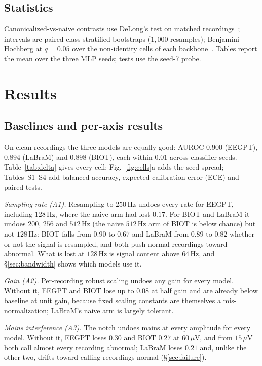 \documentclass[conference]{IEEEtran}
\begin{document}
\subsection{Statistics}
\label{sec:stats}
Canonicalized-vs-naive contrasts use DeLong's test on matched
recordings~\cite{delong1988comparing}; intervals are paired
class-stratified bootstraps ($1{,}000$ resamples); Benjamini--Hochberg
at $q{=}0.05$ over the non-identity cells of each
backbone~\cite{benjamini1995controlling}. Tables report the mean over
the three MLP seeds; tests use the seed-7 probe.

\section{Results}
\label{sec:results}

\subsection{Baselines and per-axis results}
\label{sec:axes}
On clean recordings the three models are equally good: AUROC $0.900$
(EEGPT), $0.894$ (LaBraM) and $0.898$ (BIOT), each within $0.01$ across
classifier seeds. Table~\ref{tab:delta} gives every cell;
Fig.~\ref{fig:cells}a adds the seed spread; Tables~S1--S4 add balanced
accuracy, expected calibration error (ECE) and paired tests.

\textit{Sampling rate (A1).} Resampling to $250$\,Hz undoes every rate
for EEGPT, including $128$\,Hz, where the naive arm had lost $0.17$.
For BIOT and LaBraM it undoes $200$, $256$ and $512$\,Hz (the naive
$512$\,Hz arm of BIOT is below chance) but not $128$\,Hz: BIOT falls
from $0.90$ to $0.67$ and LaBraM from $0.89$ to $0.82$ whether or not
the signal is resampled, and both push normal recordings toward
abnormal. What is lost at $128$\,Hz is signal content above $64$\,Hz,
and \S\ref{sec:bandwidth} shows which models use it.

\textit{Gain (A2).} Per-recording robust scaling undoes any gain for
every model. Without it, EEGPT and BIOT lose up to $0.08$ at half
gain and are already below baseline at unit gain, because fixed
scaling constants are themselves a mis-normalization; LaBraM's naive
arm is largely tolerant.

\textit{Mains interference (A3).} The notch undoes mains at every
amplitude for every model. Without it, EEGPT loses $0.30$ and BIOT
$0.27$ at $60\,\mu$V, and from $15\,\mu$V both call almost every
recording abnormal; LaBraM loses $0.21$ and, unlike the other two,
drifts toward calling recordings normal (\S\ref{sec:failure}).
\end{document}

